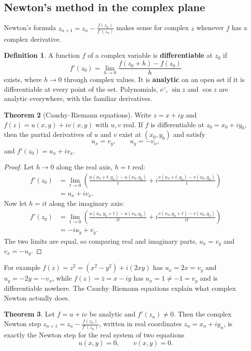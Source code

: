 \documentclass[11pt,a4paper]{article}
\numberwithin{equation}{section}
\theoremstyle{definition}
\newtheorem{thm}{Theorem}[subsection]
\newtheorem{defn}[thm]{Definition}
\begin{document}
\subsection{Newton's method in the complex plane}
\label{sec:complexnewton}

Newton's formula $z_{n+1} = z_n-\frac{f(z_n)}{f'(z_n)}$ makes sense for complex $z$ whenever $f$ has a complex derivative.

\begin{defn}
A function $f$ of a complex variable is \textbf{differentiable} at $z_0$ if
$$f'(z_0) = \lim_{h\rightarrow0}\frac{f(z_0+h)-f(z_0)}{h}$$
exists, where $h\longrightarrow0$ through complex values. It is \textbf{analytic} on an open set if it is differentiable at every point of the
set. Polynomials, $e^z$, $\sin z$ and $\cos z$ are analytic everywhere, with the familiar derivatives.
\end{defn}

\begin{thm}[Cauchy--Riemann equations]
\label{thm:cr}
Write $z = x+iy$ and $f(z) = u(x,y)+iv(x,y)$ with $u, v$ real. If $f$ is differentiable at $z_0 = x_0+iy_0$, then the partial derivatives of
$u$ and $v$ exist at $(x_0,y_0)$ and satisfy
$$u_x = v_y,\qquad u_y = -v_x,$$
and $f'(z_0) = u_x+iv_x$.
\end{thm}

\begin{proof}
Let $h\longrightarrow0$ along the real axis, $h = t$ real:
\begin{align*}
f'(z_0) &= \lim_{t\rightarrow0}\left(\frac{u(x_0+t,y_0)-u(x_0,y_0)}{t}+i\frac{v(x_0+t,y_0)-v(x_0,y_0)}{t}\right)\\
&= u_x+iv_x .
\end{align*}
Now let $h = it$ along the imaginary axis:
\begin{align*}
f'(z_0) &= \lim_{t\rightarrow0}\left(\frac{u(x_0,y_0+t)-u(x_0,y_0)}{it}+i\frac{v(x_0,y_0+t)-v(x_0,y_0)}{it}\right)\\
&= -iu_y+v_y .
\end{align*}
The two limits are equal, so comparing real and imaginary parts, $u_x = v_y$ and $v_x = -u_y$.
\end{proof}

For example $f(z) = z^2 = (x^2-y^2)+i(2xy)$ has $u_x = 2x = v_y$ and $u_y = -2y = -v_x$, while $f(z) = \bar z = x-iy$ has $u_x = 1\neq-1 = v_y$
and is differentiable nowhere. The Cauchy--Riemann equations explain what complex Newton actually does.

\begin{thm}
\label{thm:newton2d}
Let $f = u+iv$ be analytic and $f'(z_n)\neq0$. Then the complex Newton step $z_{n+1} = z_n-\frac{f(z_n)}{f'(z_n)}$, written in real coordinates
$z_n = x_n+iy_n$, is exactly the Newton step for the real system of two equations
$$u(x,y) = 0,\qquad v(x,y) = 0 .$$
\end{thm}
\end{document}
